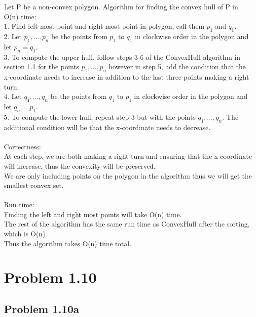 \documentclass[11pt,psfig]{article}
\begin{document}
Let P be a non-convex polygon. Algorithm for finding the convex hull of P in O(n) time:
\\
1. Find left-most point and right-most point in polygon, call them $p_1$ and $q_1$. \\
2. Let $p_1,...,p_n$ be the points from $p_1$ to $q_1$ in clockwise order in the polygon and let $p_n=q_1$. \\
3. To compute the upper hull, follow steps 3-6 of the ConvexHull algorithm in section 1.1 for the points $p_1,...,p_n$ however in step 5, add the condition that the x-coordinate needs to increase in addition to the last three points making a right turn.\\
4. Let $q_1,...,q_n$ be the points from $q_1$ to $p_1$ in clockwise order in the polygon and let $q_n=p_1$. \\
5. To compute the lower hull, repeat step 3 but with the points $q_1,...,q_n$. The additional condition will be that the x-coordinate needs to decrease. 
\\
\\
Correctness:\\
At each step, we are both making a right turn and ensuring that the x-coordinate will increase, thus the convexity will be preserved. \\
We are only including points on the polygon in the algorithm thus we will get the smallest convex set. \\
\\
Run time:\\
Finding the left and right most points will take O(n) time.\\
The rest of the algorithm has the same run time as ConvexHull after the sorting, which is O(n).\\
Thus the algorithm takes O(n) time total.

\newpage


\section*{Problem 1.10}

\subsection*{Problem 1.10a}
\end{document}
